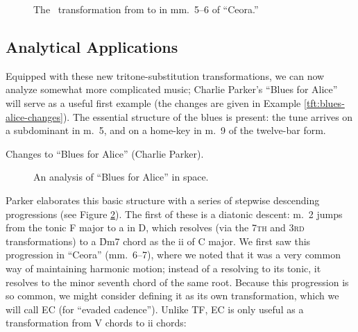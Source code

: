 \begin{figure}[htbp]
  \caption{The \slideS\ transformation from \protect{} to
    \protect{} in mm.~5--6 of ``Ceora.''}
  \label{tft:slide7-ceora}
\end{figure}




\subsection{Analytical Applications}

Equipped with these new tritone-substitution transformations, we can now
analyze somewhat more complicated music; Charlie Parker’s “Blues for Alice”
will serve as a useful first example (the changes are given in Example
\ref{tft:blues-alice-changes}). The essential structure of the blues is
present: the tune arrives on a subdominant in m.~5, and on a home-key \tf in
m.~9 of the twelve-bar form.

\begin{example}[tbhp]
  \caption{Changes to ``Blues for Alice'' (Charlie Parker).}
  \label{tft:blues-alice-changes}
\end{example}

\begin{figure}[thbp]
  \caption{An analysis of ``Blues for Alice'' in \tf space.}
  \label{tft:blues-alice-network}
\end{figure}


Parker elaborates this basic structure with a series of stepwise descending
\tf progressions (see Figure \ref{tft:blues-alice-network}). The first of
these is a diatonic descent: m.~2 jumps from the tonic F  major to a \tf in D,
which resolves (via the \textsc{7th} and \textsc{3rd} transformations) to a
\h{Dm7} chord as the ii of C major. We first saw this progression in
``Ceora'' (mm.~6--7), where we noted that it was a very common way of
maintaining harmonic motion; instead of a \tf resolving to its tonic, it resolves
to the minor seventh chord of the same root. Because this progression is so
common, we might consider defining it as its own transformation, which we will
call EC (for ``evaded cadence''). Unlike TF, EC is only useful as a
transformation from V chords to ii chords:

